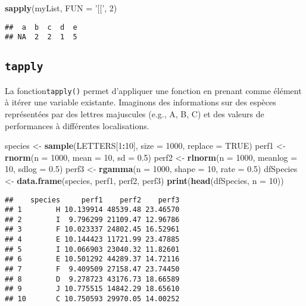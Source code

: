 \documentclass[]{book}
\newenvironment{Shaded}{\begin{snugshade}}{\end{snugshade}}
\newcommand{\KeywordTok}[1]{\textcolor[rgb]{0.13,0.29,0.53}{\textbf{#1}}}
\newcommand{\DataTypeTok}[1]{\textcolor[rgb]{0.13,0.29,0.53}{#1}}
\newcommand{\DecValTok}[1]{\textcolor[rgb]{0.00,0.00,0.81}{#1}}
\newcommand{\FloatTok}[1]{\textcolor[rgb]{0.00,0.00,0.81}{#1}}
\newcommand{\StringTok}[1]{\textcolor[rgb]{0.31,0.60,0.02}{#1}}
\newcommand{\OtherTok}[1]{\textcolor[rgb]{0.56,0.35,0.01}{#1}}
\newcommand{\OperatorTok}[1]{\textcolor[rgb]{0.81,0.36,0.00}{\textbf{#1}}}
\newcommand{\NormalTok}[1]{#1}
\theoremstyle{definition}
\theoremstyle{definition}
\theoremstyle{definition}
\theoremstyle{remark}
\begin{document}
\begin{Shaded}
\begin{Highlighting}[]
\KeywordTok{sapply}\NormalTok{(myList, }\DataTypeTok{FUN =} \StringTok{'[['}\NormalTok{, }\DecValTok{2}\NormalTok{)}
\end{Highlighting}
\end{Shaded}

\begin{verbatim}
##  a  b  c  d  e 
## NA  2  2  1  5
\end{verbatim}

\subsection{\texorpdfstring{\texttt{tapply}}{tapply}}\label{l17tapply}

La fonction\texttt{tapply()} permet d'appliquer une fonction en prenant
comme élément à itérer une variable existante. Imaginons des
informations sur des espèces représentées par des lettres majuscules
(e.g., A, B, C) et des valeurs de performances à différentes
localisations.

\begin{Shaded}
\begin{Highlighting}[]
\NormalTok{species <-}\StringTok{ }\KeywordTok{sample}\NormalTok{(LETTERS[}\DecValTok{1}\OperatorTok{:}\DecValTok{10}\NormalTok{], }\DataTypeTok{size =} \DecValTok{1000}\NormalTok{, }\DataTypeTok{replace =} \OtherTok{TRUE}\NormalTok{)}
\NormalTok{perf1 <-}\StringTok{ }\KeywordTok{rnorm}\NormalTok{(}\DataTypeTok{n =} \DecValTok{1000}\NormalTok{, }\DataTypeTok{mean =} \DecValTok{10}\NormalTok{, }\DataTypeTok{sd =} \FloatTok{0.5}\NormalTok{)}
\NormalTok{perf2 <-}\StringTok{ }\KeywordTok{rlnorm}\NormalTok{(}\DataTypeTok{n =} \DecValTok{1000}\NormalTok{, }\DataTypeTok{meanlog =} \DecValTok{10}\NormalTok{, }\DataTypeTok{sdlog =} \FloatTok{0.5}\NormalTok{)}
\NormalTok{perf3 <-}\StringTok{ }\KeywordTok{rgamma}\NormalTok{(}\DataTypeTok{n =} \DecValTok{1000}\NormalTok{, }\DataTypeTok{shape =} \DecValTok{10}\NormalTok{, }\DataTypeTok{rate =} \FloatTok{0.5}\NormalTok{)}
\NormalTok{dfSpecies <-}\StringTok{ }\KeywordTok{data.frame}\NormalTok{(species, perf1, perf2, perf3)}
\KeywordTok{print}\NormalTok{(}\KeywordTok{head}\NormalTok{(dfSpecies, }\DataTypeTok{n =} \DecValTok{10}\NormalTok{))}
\end{Highlighting}
\end{Shaded}

\begin{verbatim}
##    species     perf1    perf2    perf3
## 1        H 10.139914 48539.48 23.46570
## 2        I  9.796299 21109.47 12.96786
## 3        F 10.023337 24802.45 16.52961
## 4        E 10.144423 11721.99 23.47885
## 5        I 10.066903 23040.32 11.82601
## 6        E 10.501292 44289.37 14.72116
## 7        F  9.409509 27158.47 23.74450
## 8        D  9.278723 43176.73 18.66589
## 9        J 10.775515 14842.29 18.65610
## 10       C 10.750593 29970.05 14.00252
\end{verbatim}
\end{document}
